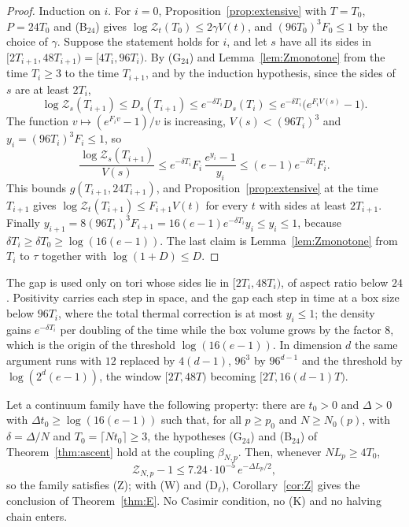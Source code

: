 \begin{proof}
Induction on $i$. For $i=0$, Proposition~\ref{prop:extensive} with $T=T_0$,
$P=24T_0$ and (B$_{24}$) gives $\log\mathcal Z_t(T_0)\le2\gamma V(t)$, and
$(96T_0)^3F_0\le1$ by the choice of $\gamma$. Suppose the statement holds
for $i$, and let $s$ have all its sides in $[2T_{i+1},48T_{i+1})=[4T_i,96T_i)$.
By (G$_{24}$) and Lemma~\ref{lem:Zmonotone} from the time $T_i\ge3$ to the
time $T_{i+1}$, and by the induction hypothesis, since the sides of $s$ are
at least $2T_i$,
\[
\log\mathcal Z_s(T_{i+1})\le D_s(T_{i+1})\le e^{-\delta T_i}D_s(T_i)\le
e^{-\delta T_i}\bigl(e^{F_iV(s)}-1\bigr).
\]
The function $v\mapsto(e^{F_iv}-1)/v$ is increasing, $V(s)<(96T_i)^3$ and
$y_i=(96T_i)^3F_i\le1$, so
\[
\frac{\log\mathcal Z_s(T_{i+1})}{V(s)}\le e^{-\delta T_i}F_i\,\frac{e^{y_i}-1}
{y_i}\le(e-1)e^{-\delta T_i}F_i .
\]
This bounds $g(T_{i+1},24T_{i+1})$, and Proposition~\ref{prop:extensive} at
the time $T_{i+1}$ gives $\log\mathcal Z_t(T_{i+1})\le F_{i+1}V(t)$ for every
$t$ with sides at least $2T_{i+1}$. Finally $y_{i+1}=8(96T_i)^3F_{i+1}=16(e
-1)e^{-\delta T_i}y_i\le y_i\le1$, because $\delta T_i\ge\delta T_0\ge\log
(16(e-1))$. The last claim is Lemma~\ref{lem:Zmonotone} from $T_i$ to
$\tau$ together with $\log(1+D)\le D$.
\end{proof}

The gap is used only on tori whose sides lie in $[2T_i,48T_i)$, of aspect
ratio below $24$. Positivity carries each step in space, and the gap each
step in time at a box size below $96T_i$, where the total thermal
correction is at most $y_i\le1$; the density gains $e^{-\delta T_i}$ per
doubling of the time while the box volume grows by the factor $8$, which is
the origin of the threshold $\log(16(e-1))$. In dimension $d$ the same
argument runs with $12$ replaced by $4(d-1)$, $96^3$ by $96^{d-1}$ and the
threshold by $\log(2^d(e-1))$, the window $[2T,48T)$ becoming $[2T,16(d-1)
T)$.

\begin{theorem}\label{thm:ascentZ}
Let a continuum family have the following property: there are $t_0>0$ and
$\Delta>0$ with $\Delta t_0\ge\log(16(e-1))$ such that, for all $p\ge p_0$
and $N\ge N_0(p)$, with $\delta=\Delta/N$ and $T_0=\lceil Nt_0\rceil\ge3$,
the hypotheses \textup{(G$_{24}$)} and \textup{(B$_{24}$)} of
Theorem~\ref{thm:ascent} hold at the coupling $\beta_{N,p}$. Then, whenever
$NL_p\ge4T_0$,
\[
\mathcal Z_{N,p}-1\le7.24\cdot10^{-5}\,e^{-\Delta L_p/2},
\]
so the family satisfies \textup{(Z)}; with \textup{(W)} and
\textup{(D$_\ell$)}, Corollary~\ref{cor:Z} gives the conclusion of
Theorem~\ref{thm:E}. No Casimir condition, no (K) and no halving chain
enters.
\end{theorem}

